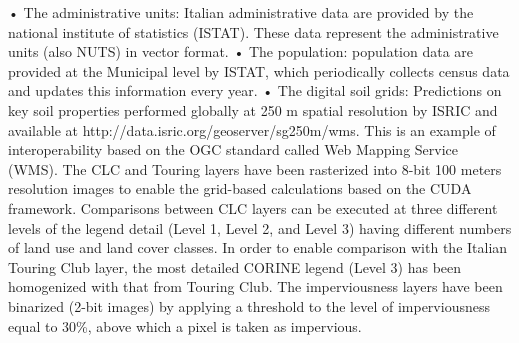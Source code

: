 \documentclass[APA,LATO1COL,doublespace]{WileyNJD-v2}
\begin{document}
•	The administrative units: Italian administrative data are provided by the national institute of statistics (ISTAT). These data represent the administrative units (also NUTS) in vector format.
•	The population: population data are provided at the Municipal level by ISTAT, which periodically collects census data and updates this information every year. 
•	The digital soil grids: Predictions on key soil properties performed globally at 250 m spatial resolution by ISRIC and available at http://data.isric.org/geoserver/sg250m/wms. This is an example of interoperability based on the OGC standard called Web Mapping Service (WMS).
The CLC and Touring layers have been rasterized into 8-bit 100 meters resolution images to enable the grid-based calculations based on the CUDA framework. Comparisons between CLC layers can be executed at three different levels of the legend detail (Level 1, Level 2, and Level 3) having different numbers of land use and land cover classes. In order to enable comparison with the Italian Touring Club layer, the most detailed CORINE legend (Level 3) has been homogenized with that from Touring Club. The imperviousness layers have been binarized (2-bit images) by applying a threshold to the level of imperviousness equal to 30\%, above which a pixel is taken as impervious.
\end{document}
